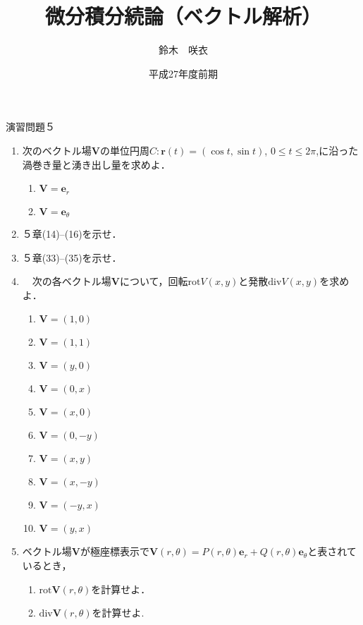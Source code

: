 \documentclass{jarticle}
\begin{document}
\title{微分積分続論（ベクトル解析）} 
\author{鈴木　咲衣}
\date{平成27年度前期}
\maketitle

\begin{center} {\Large 演習問題５ } \end{center}

\begin{enumerate}
\item 次のベクトル場$\bm V$の単位円周$C: \bm r(t)=(\cos t, \sin t)$, $0\leq t\leq 2\pi$,に沿った渦巻き量と湧き出し量を求めよ．
\begin{enumerate}
\item
$\bm V=\bm e_{r}$
\item
$\bm V=\bm e_{\theta}$
\end{enumerate}
\item ５章(14)--(16)を示せ．
\item ５章(33)--(35)を示せ．
\item \cite[問題6.16]{koba}　次の各ベクトル場$\bm V$について，回転$\mathrm {rot} V(x,y)$と発散$\mathrm {div} V(x,y)$を求めよ．
\begin{enumerate}
\item $\bm V=(1,0)$
\item $\bm V=(1,1)$
\item $\bm V=(y,0)$
\item $\bm V=(0,x)$
\item $\bm V=(x,0)$
\item $\bm V=(0,-y)$
\item $\bm V=(x,y)$
\item $\bm V=(x,-y)$
\item $\bm V=(-y,x)$
\item $\bm V=(y,x)$
\end{enumerate}
\item \cite[問題6.24]{koba}ベクトル場$\bm V$が極座標表示で$\bm V(r, \theta)=P(r,\theta) \bm e_{r}+ Q (r, \theta) \bm e_{\theta}$と表されているとき，
\begin{enumerate}
\item $\mathrm {rot} \bm V (r,\theta)$を計算せよ．
\item $\mathrm {div} \bm V (r,\theta)$を計算せよ. 
\end{enumerate}
\end{enumerate}

\newpage
\end{document}
